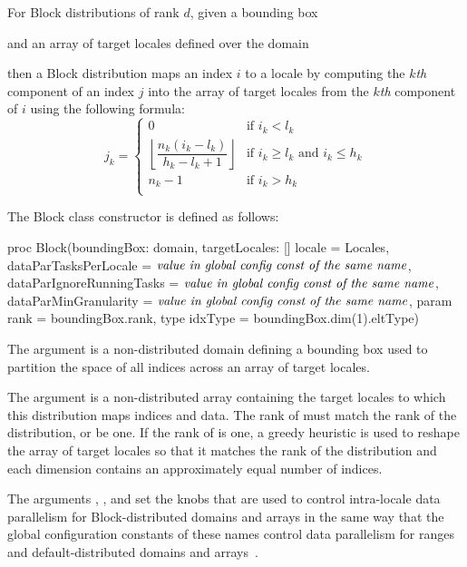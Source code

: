 For Block distributions of rank $d$, given a bounding box
\begin{chapel}
[$l_1$..$h_1$, $\ldots$, $l_d$..$h_d$]
\end{chapel}
and an array of target locales defined over the domain
\begin{chapel}
[$0$..$n_1$-1, $\ldots$, $0$..$n_d-1$]
\end{chapel}
then a Block distribution maps an index $i$ to a locale by computing
the $k$\emph{th} component of an index $j$ into the array of target
locales from the $k$\emph{th} component of $i$ using the following
formula:
\[
j_k = \left\{
  \begin{array}{ll}
    0 & \mbox{if $i_k < l_k$} \\
    \left\lfloor\dfrac{n_k (i_k - l_k)}{h_k - l_k + 1}\right\rfloor & \mbox{if $i_k \geq l_k$ and $i_k \leq h_k$} \\
    n_k-1 & \mbox{if $i_k > h_k$} \\
  \end{array}
\right.
\]

The Block class constructor is defined as follows:
\begin{chapel}
proc Block(boundingBox: domain,
          targetLocales: [] locale = Locales, 
          dataParTasksPerLocale = $\mbox{{\it value in global config const of the same name}}$,
          dataParIgnoreRunningTasks = $\mbox{{\it value in global config const of the same name}}$,
          dataParMinGranularity = $\mbox{{\it value in global config const of the same name}}$,
          param rank = boundingBox.rank,
          type idxType = boundingBox.dim(1).eltType)
\end{chapel}

The argument  is a non-distributed domain defining a
bounding box used to partition the space of all indices across an
array of target locales.

The argument  is a non-distributed array
containing the target locales to which this distribution maps indices
and data.  The rank of  must match the rank of the
distribution, or be one.  If the rank of
 is one, a greedy heuristic is used to reshape the
array of target locales so that it matches the rank of the
distribution and each dimension contains an approximately equal number
of indices.

The
arguments , ,
and  set the knobs that are used to
control intra-locale data parallelism for Block-distributed domains
and arrays in the same way that the global configuration constants of
these names control data parallelism for ranges and
default-distributed domains and arrays~.

